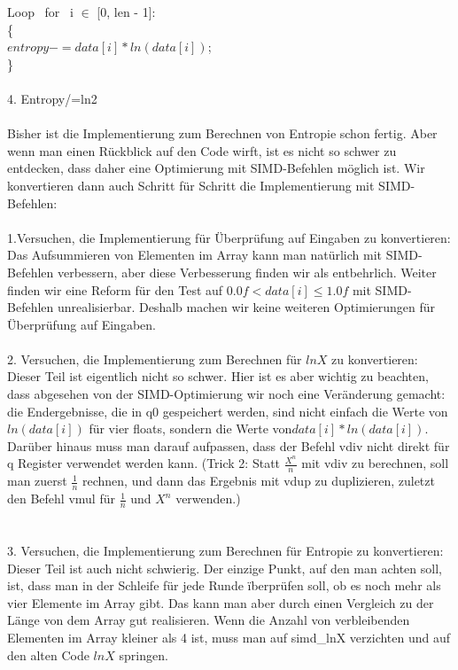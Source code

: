 \documentclass[11pt]{article}
\begin{document}
{{{{Loop \ for \ i $\in$ [0, len - 1]: \\
\{ \\
        $entropy -= data[i] * ln(data[i])$; \\
\}
}\\\\
{\Large 4.} Entropy/=ln2  \\\\
Bisher ist die Implementierung zum Berechnen von Entropie schon fertig. Aber wenn man einen R\"uckblick auf den Code wirft, ist es nicht so schwer zu entdecken, dass daher eine Optimierung mit SIMD-Befehlen m\"oglich ist. Wir konvertieren dann auch Schritt f\"ur Schritt die Implementierung mit SIMD-Befehlen:\\\\
 {\Large 1.}Versuchen, die Implementierung f\"ur \"Uberpr\"ufung auf Eingaben zu konvertieren:\\
Das Aufsummieren von Elementen im Array kann man nat\"urlich mit SIMD-Befehlen verbessern, aber diese Verbesserung finden wir als entbehrlich. Weiter finden wir eine Reform f\"ur den Test auf $0.0f < data[i] ≤ 1.0f$ mit SIMD-Befehlen unrealisierbar. Deshalb machen wir keine weiteren Optimierungen f\"ur \"Uberpr\"ufung auf Eingaben.\\\\
{\Large 2.}	Versuchen, die Implementierung zum Berechnen f\"ur $ln{X}$ zu konvertieren:\\
Dieser Teil ist eigentlich nicht so schwer. Hier ist es aber wichtig zu beachten, dass abgesehen von der SIMD-Optimierung wir noch eine Ver\"anderung gemacht: die Endergebnisse, die in q0 gespeichert werden, sind nicht einfach die Werte von $ln{(data[i])}$ f\"ur vier floats, sondern die Werte von$ data[i] * ln(data[i])$. Dar\"uber hinaus muss man darauf aufpassen, dass der Befehl vdiv nicht direkt f\"ur q Register verwendet werden kann. ({\color{red}Trick 2: Statt $\displaystyle{\frac{X^n}{n}}$ mit vdiv zu berechnen, soll man zuerst $\displaystyle{\frac{1}{n}}$ rechnen, und dann das Ergebnis mit vdup zu duplizieren, zuletzt den Befehl vmul f\"ur $\displaystyle{\frac{1}{n}}$ und $X^n$ verwenden.})\\
\\\\
{\Large 3.}	Versuchen, die Implementierung zum Berechnen f\"ur Entropie zu konvertieren:
Dieser Teil ist auch nicht schwierig. Der einzige Punkt, auf den man achten soll, ist, dass man in der Schleife f\"ur jede Runde \"iberpr\"ufen soll, ob es noch mehr als vier Elemente im Array gibt. Das kann man aber durch einen Vergleich zu der L\"ange von dem Array gut realisieren. Wenn die Anzahl von verbleibenden Elementen im Array kleiner als 4 ist, muss man auf simd\_lnX verzichten und auf den alten Code $ln{X}$ springen.\\ 

}}}
\end{document}
